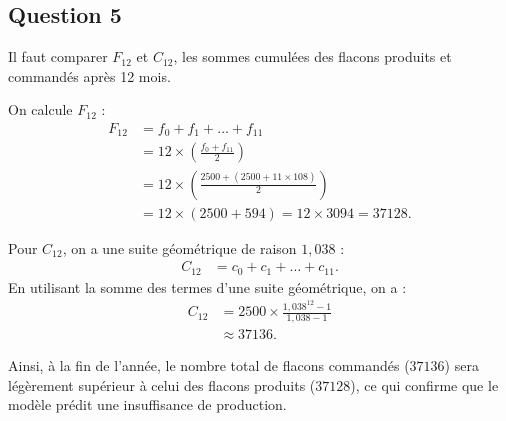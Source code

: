 \subsection*{Question 5}

Il faut comparer $F_{12}$ et $C_{12}$, les sommes cumulées des flacons produits et commandés après 12 mois.

On calcule $F_{12}$ :
\begin{align*}
	F_{12} &= f_0 + f_1 + \dots + f_{11} \\
	&= 12 \times \left( \frac{f_0 + f_{11}}{2} \right) \\
	&= 12 \times \left( \frac{2500 + (2500 + 11 \times 108)}{2} \right) \\
	&= 12 \times (2500 + 594) = 12 \times 3094 = 37128.
\end{align*}

Pour $C_{12}$, on a une suite géométrique de raison $1,038$ :
\begin{align*}
	C_{12} &= c_0 + c_1 + \dots + c_{11}.
\end{align*}
En utilisant la somme des termes d'une suite géométrique, on a :
\begin{align*}
	C_{12} &= 2500 \times \frac{1,038^{12} - 1}{1,038 - 1} \\
	&\approx 37136.
\end{align*}

Ainsi, à la fin de l'année, le nombre total de flacons commandés ($37136$) sera légèrement supérieur à celui des flacons produits ($37128$), ce qui confirme que le modèle prédit une insuffisance de production.
